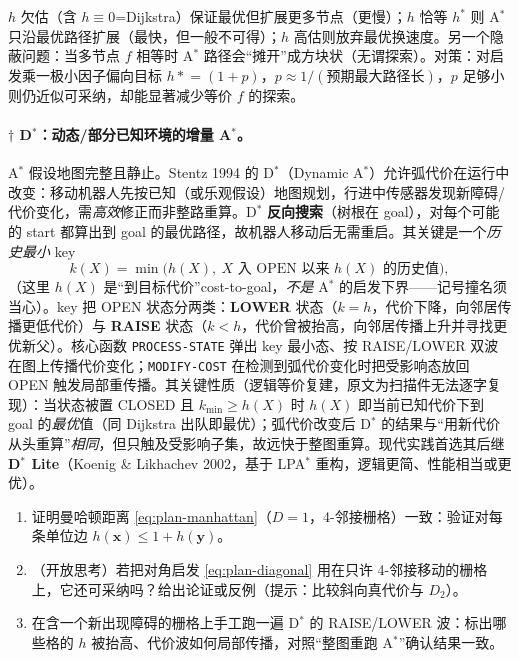 \begin{pitfall}
$h$ 欠估（含 $h\equiv0$=Dijkstra）保证最优但扩展更多节点（更慢）；$h$ 恰等 $h^*$ 则 A$^*$ 只沿最优路径扩展（最快，但一般不可得）；$h$ 高估则放弃最优换速度。另一个隐蔽问题：当多节点 $f$ 相等时 A$^*$ 路径会“摊开”成方块状（无谓探索）。对策：对启发乘一极小因子偏向目标 $h\mathrel{*}=(1+p)$，$p\approx1/(\text{预期最大路径长})$，$p$ 足够小则仍近似可采纳，却能显著减少等价 $f$ 的探索。
\end{pitfall}

\paragraph{$\dagger$ D$^*$：动态/部分已知环境的增量 A$^*$。}\rebuilt
A$^*$ 假设地图完整且静止。Stentz 1994 的 D$^*$（Dynamic A$^*$）允许弧代价在运行中改变\cite{stentz1994optimal}：移动机器人先按已知（或乐观假设）地图规划，行进中传感器发现新障碍/代价变化，需\emph{高效}修正而非整路重算。D$^*$ \textbf{反向搜索}（树根在 goal），对每个可能的 start 都算出到 goal 的最优路径，故机器人移动后无需重启。其关键是一个\emph{历史最小} key
\begin{equation}
  k(X)=\min\big(h(X),\ X\text{ 入 OPEN 以来 }h(X)\text{ 的历史值}\big),
  \label{eq:plan-dstar-key}
\end{equation}
（这里 $h(X)$ 是“到目标代价”cost-to-goal，\emph{不是} A$^*$ 的启发下界——记号撞名须当心）。key 把 OPEN 状态分两类：\textbf{LOWER} 状态（$k=h$，代价下降，向邻居传播更低代价）与 \textbf{RAISE} 状态（$k<h$，代价曾被抬高，向邻居传播上升并寻找更优新父）。核心函数 \texttt{PROCESS-STATE} 弹出 key 最小态、按 RAISE/LOWER 双波在图上传播代价变化；\texttt{MODIFY-COST} 在检测到弧代价变化时把受影响态放回 OPEN 触发局部重传播。其关键性质（逻辑等价复建，原文为扫描件无法逐字复现）：当状态被置 CLOSED 且 $k_{\min}\ge h(X)$ 时 $h(X)$ 即当前已知代价下到 goal 的\emph{最优}值（同 Dijkstra 出队即最优）；弧代价改变后 D$^*$ 的结果与“用新代价从头重算”\emph{相同}，但只触及受影响子集，故远快于整图重算。现代实践首选其后继 \textbf{D$^*$ Lite}（Koenig \& Likhachev 2002，基于 LPA$^*$ 重构，逻辑更简、性能相当或更优）。

\begin{practice}
\begin{enumerate}
  \item 证明曼哈顿距离 \cref{eq:plan-manhattan}（$D=1$，4-邻接栅格）一致：验证对每条单位边 $h(\mathbf{x})\le1+h(\mathbf{y})$。
  \item （开放思考）若把对角启发 \cref{eq:plan-diagonal} 用在只许 4-邻接移动的栅格上，它还可采纳吗？给出论证或反例（提示：比较斜向真代价与 $D_2$）。
  \item 在含一个新出现障碍的栅格上手工跑一遍 D$^*$ 的 RAISE/LOWER 波：标出哪些格的 $h$ 被抬高、代价波如何局部传播，对照“整图重跑 A$^*$”确认结果一致。
\end{enumerate}
\end{practice}

